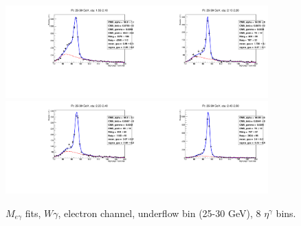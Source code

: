 \begin{figure}[htb]
\begin{center}
   \includegraphics[width=0.45\textwidth]{../figs/figs_v11/ELECTRON_WGamma/EtoGammaFits/sa_hZmass_h_Data_EtoGamma_Enr_ENDCAP_pt25to30_ieta0_noWMtCut.pdf}\includegraphics[width=0.45\textwidth]{../figs/figs_v11/ELECTRON_WGamma/EtoGammaFits/sa_hZmass_h_Data_EtoGamma_Enr_ENDCAP_pt25to30_ieta1_noWMtCut.pdf}\\
   \includegraphics[width=0.45\textwidth]{../figs/figs_v11/ELECTRON_WGamma/EtoGammaFits/sa_hZmass_h_Data_EtoGamma_Enr_ENDCAP_pt25to30_ieta2_noWMtCut.pdf}\includegraphics[width=0.45\textwidth]{../figs/figs_v11/ELECTRON_WGamma/EtoGammaFits/sa_hZmass_h_Data_EtoGamma_Enr_ENDCAP_pt25to30_ieta3_noWMtCut.pdf}\\
  \label{fig:etogFits_25to30}
  \caption{$M_{e\gamma}$ fits, $W\gamma$, electron channel, underflow bin (25-30 GeV), 8 $\eta^{\gamma}$ bins.}
  \end{center}
\end{figure}


